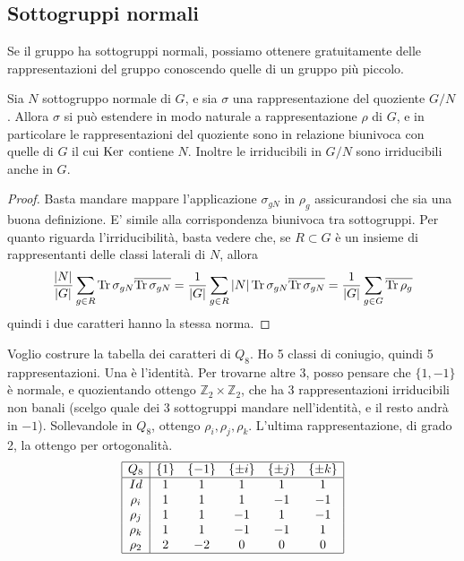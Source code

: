 \documentclass[a4paper,10pt,oneside]{math_article}
\newcommand{\Cyc}{\mathbb Z}
\let\conj\overline
\begin{document}
  \subsection{Sottogruppi normali}
    Se il gruppo ha sottogruppi normali, possiamo ottenere gratuitamente delle rappresentazioni del gruppo conoscendo quelle di un gruppo più piccolo.
    
    \begin{myprop}
     Sia $N$ sottogruppo normale di $G$, e sia $\sigma$ una rappresentazione del quoziente $G/N$. Allora $\sigma$ si può estendere in modo naturale a rappresentazione $\rho$ di $G$, e in particolare le rappresentazioni del quoziente sono in relazione biunivoca con quelle di $G$ il cui $\operatorname{Ker}$ contiene $N$. Inoltre le irriducibili in $G/N$ sono irriducibili anche in $G$.
    \end{myprop}
    \begin{proof}
     Basta mandare mappare l'applicazione $\sigma_{gN}$ in $\rho_g$ assicurandosi che sia una buona definizione. E' simile alla corrispondenza biunivoca tra sottogruppi.
     Per quanto riguarda l'irriducibilità, basta vedere che, se $R\subset G$ è un insieme di rappresentanti delle classi laterali di $N$, allora 
     \[
      \frac{\abs{N}}{\abs{G}} \sum_{g\in R}\Tr \sigma_{gN}\conj{\Tr \sigma_{gN}} = \frac1{\abs G} \sum_{g\in R} \abs N \Tr \sigma_{gN}\conj{\Tr \sigma_{gN}} = \frac1{\abs G} \sum_{g\in G} \conj{\Tr \rho_{g}}
     \]
     quindi i due caratteri hanno la stessa norma.
    \end{proof}
    
    \begin{myexample} 
    Voglio costrure la tabella dei caratteri di $Q_8$. Ho 5 classi di coniugio, quindi 5 rappresentazioni. Una è l'identità. Per trovarne altre 3, posso pensare che $\{1,-1\}$ è normale, e quozientando ottengo $\Cyc_2 \times \Cyc_2$, che ha 3 rappresentazioni irriducibili non banali (scelgo quale dei 3 sottogruppi mandare nell'identità, e il resto andrà in $-1$). Sollevandole in $Q_8$, ottengo $\rho_i,\rho_j,\rho_k$. L'ultima rappresentazione, di grado 2, la ottengo per ortogonalità.
     \[
      \begin{array}{|c|ccccc|}
      \hline
       Q_8    & \{1\} & \{-1\} & \{\pm i\} & \{\pm j\} & \{\pm k\} \\ \hline
       Id     &   1   &    1   &     1     &     1     &     1     \\ 
       \rho_i &   1   &    1   &     1     &    -1     &    -1     \\
       \rho_j &   1   &    1   &    -1     &     1     &    -1     \\
       \rho_k &   1   &    1   &    -1     &    -1     &     1     \\
       \rho_2 &   2   &   -2   &     0     &     0     &     0     \\ \hline
      \end{array}
     \]
     
     
    \end{myexample}
\end{document}

